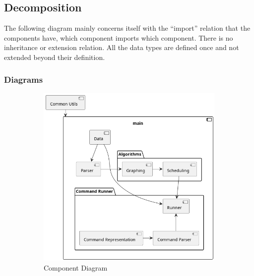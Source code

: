 \documentclass[11pt]{article}
\begin{document}
\subsection{Decomposition}

The following diagram mainly concerns itself with the ``import'' relation that
the components have, which component imports which component. There is no
inheritance or extension relation. All the data types are defined once and not
extended beyond their definition.

\newpage
\subsubsection{Diagrams}

\begin{figure}[h!]
  \centering
  \begin{subfigure}{0.5\linewidth}
    \includegraphics[width=\linewidth]{diags/components.png}
    \caption{\label{fig:comp}Component Diagram}
  \end{subfigure}
  \begin{subfigure}{0.15\linewidth}

\end{subfigure}
\end{figure}
\end{document}
